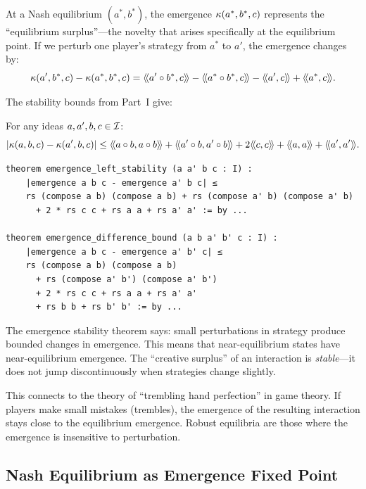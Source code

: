At a Nash equilibrium $(a^*, b^*)$, the emergence $\kappa(a^*, b^*, c)$
represents the ``equilibrium surplus''---the novelty that arises specifically at
the equilibrium point. If we perturb one player's strategy from $a^*$ to $a'$,
the emergence changes by:
\[
  \emerge(a', b^*, c) - \emerge(a^*, b^*, c)
  = \rs{a' \compose b^*}{c} - \rs{a^* \compose b^*}{c}
  - \rs{a'}{c} + \rs{a^*}{c}.
\]

The stability bounds from Part~I give:

\begin{theorem}
\label{thm:emergence-stability}
For any ideas $a, a', b, c \in \mathcal{I}$:
\[
  |\emerge(a, b, c) - \emerge(a', b, c)| \leq
  \rs{a \compose b}{a \compose b} + \rs{a' \compose b}{a' \compose b}
  + 2\rs{c}{c} + \rs{a}{a} + \rs{a'}{a'}.
\]
\end{theorem}

\begin{lstlisting}[caption={Emergence stability (IDT\_v3\_Emergence.lean)}]
theorem emergence_left_stability (a a' b c : I) :
    |emergence a b c - emergence a' b c| ≤
    rs (compose a b) (compose a b) + rs (compose a' b) (compose a' b)
      + 2 * rs c c + rs a a + rs a' a' := by ...

theorem emergence_difference_bound (a b a' b' c : I) :
    |emergence a b c - emergence a' b' c| ≤
    rs (compose a b) (compose a b)
      + rs (compose a' b') (compose a' b')
      + 2 * rs c c + rs a a + rs a' a'
      + rs b b + rs b' b' := by ...
\end{lstlisting}

\begin{interpretation}
The emergence stability theorem says: small perturbations in strategy produce
bounded changes in emergence. This means that near-equilibrium states have
near-equilibrium emergence. The ``creative surplus'' of an interaction is
\emph{stable}---it does not jump discontinuously when strategies change slightly.

This connects to the theory of ``trembling hand perfection'' in game theory.
If players make small mistakes (trembles), the emergence of the resulting
interaction stays close to the equilibrium emergence. Robust equilibria are
those where the emergence is insensitive to perturbation.
\end{interpretation}

\subsection{Nash Equilibrium as Emergence Fixed Point}

